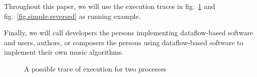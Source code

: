 \documentclass{article}
\begin{document}

    
    Throughout this paper, we will use the execution traces in fig.~\ref{fig.simple} and fig.~\ref{fig.simple-reversed} as running example. 
    
    Finally, we will call developers the persons implementing dataflow-based software and users, authors, or composers the persons using dataflow-based software to implement their own music algorithms.
    
    \begin{figure}
        \centering
        \caption{A possible trace of execution for two processes}
        \label{fig.simple}
    \end{figure}
	
\end{document}
